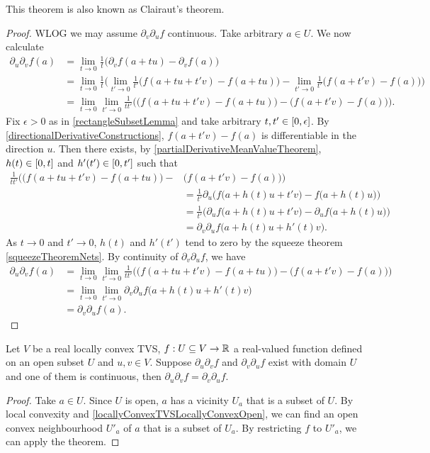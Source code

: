 This theorem is also known as Clairaut's theorem.
\begin{proof}
WLOG we may assume $\partial_v\partial_u f$ continuous. Take arbitrary $a\in U$. We now calculate
\begin{align*}
\partial_u\partial_v f(a) &= \lim_{t\to 0}\frac{1}{t}\big(\partial_v f(a+tu) - \partial_v f(a)\big) \\
&= \lim_{t\to 0}\frac{1}{t}\Big(\lim_{t'\to 0}\frac{1}{t'}\big(f(a+tu+t'v) - f(a+tu)\big) - \lim_{t'\to 0}\frac{1}{t'}\big(f(a+t'v) - f(a)\big)\Big) \\
&= \lim_{t\to 0}\lim_{t'\to 0}\frac{1}{tt'}\Big(\big(f(a+tu+t'v) - f(a+tu)\big) - \big(f(a+t'v) - f(a)\big)\Big).
\end{align*}
Fix $\epsilon > 0$ as in \ref{rectangleSubsetLemma} and take arbitrary $t,t'\in \interval{0, \epsilon}$. By \ref{directionalDerivativeConstructions}, $f(a+t'v) - f(a)$ is differentiable in the direction $u$. Then there exists, by \ref{partialDerivativeMeanValueTheorem}, $h(t) \in \interval{0,t}$ and $h'(t')\in \interval{0,t'}$ such that
\begin{align*}
\frac{1}{tt'}\Big(\big(f(a+tu+t'v) - f(a+tu)\big) - &\big(f(a+t'v) - f(a)\big)\Big) \\
&= \frac{1}{t'}\partial_u\Big(f\big(a+h(t)u+t'v\big) - f\big(a+h(t)u\big)\Big) \\
&= \frac{1}{t'}\Big(\partial_uf\big(a+h(t)u+t'v\big) - \partial_uf\big(a+h(t)u\big)\Big) \\
&= \partial_v\partial_uf\big(a+h(t)u+h'(t)v\big).
\end{align*}
As $t\to 0$ and $t'\to 0$, $h(t)$ and $h'(t')$ tend to zero by the squeeze theorem \ref{squeezeTheoremNets}. By continuity of $\partial_v\partial_uf$, we have
\begin{align*}
\partial_u\partial_v f(a) &= \lim_{t\to 0}\lim_{t'\to 0}\frac{1}{tt'}\Big(\big(f(a+tu+t'v) - f(a+tu)\big) - \big(f(a+t'v) - f(a)\big)\Big) \\
&= \lim_{t\to 0}\lim_{t'\to 0}\partial_v\partial_uf\big(a+h(t)u+h'(t)v\big) \\
&= \partial_v\partial_u f(a).
\end{align*}
\end{proof}
\begin{corollary}
Let $V$ be a real locally convex TVS, $f:U\subseteq V\to \mathbb{R}$ a real-valued function defined on an open subset $U$ and $u,v\in V$. Suppose $\partial_u\partial_v f$ and $\partial_v\partial_u f$ exist with domain $U$ and one of them is continuous, then $\partial_u\partial_v f = \partial_v\partial_u f$.
\end{corollary}
\begin{proof}
Take $a\in U$. Since $U$ is open, $a$ has a vicinity $U_a$ that is a subset of $U$. By local convexity and \ref{locallyConvexTVSLocallyConvexOpen}, we can find an open convex neighbourhood $U'_a$ of $a$ that is a subset of $U_a$. By restricting $f$ to $U'_a$, we can apply the theorem.
\end{proof}


